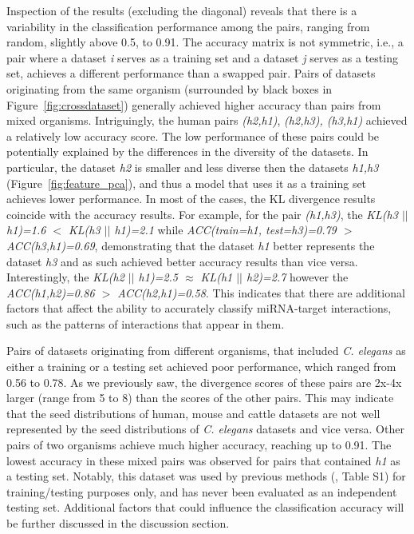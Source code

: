 \documentclass{bmcart}
\begin{document}
Inspection of the results (excluding the diagonal) reveals that there is a variability in the classification performance among the pairs, ranging from random, slightly above 0.5, to 0.91. The accuracy matrix is not symmetric, i.e., a pair where a dataset \textit{i} serves as a training set and a dataset \textit{j} serves as a testing set, achieves a different performance than a swapped pair. Pairs of datasets originating from the same organism (surrounded by black boxes in Figure~\ref{fig:crossdataset}) generally achieved higher accuracy than pairs from mixed organisms. Intriguingly, the human pairs \textit{(h2,h1)}, \textit{(h2,h3), \textit{(h3,h1)}} achieved a relatively low accuracy score. The low performance of these pairs could be potentially explained by the differences in the diversity of the datasets. In particular, the dataset \textit{h2} is smaller and less diverse then the datasets \textit{h1,h3} (Figure~\ref{fig:feature_pca}), and thus a model that uses it as a training set achieves lower performance. In most of the cases, the KL divergence results coincide with the accuracy results. For example, for the pair \textit{(h1,h3)}, the \textit{KL(h3 $||$ h1)=1.6 $<$ KL(h3 $||$ h1)=2.1} while \textit{ACC(train=h1, test=h3)=0.79 $>$ ACC(h3,h1)=0.69}, demonstrating that the dataset \textit{h1} better represents the dataset \textit{h3} and as such achieved better accuracy results than vice versa. Interestingly, the \textit{KL(h2 $||$ h1)=2.5 $\approx$ KL(h1 $||$ h2)=2.7} however the \textit{ACC(h1,h2)=0.86 $>$ ACC(h2,h1)=0.58}. This indicates that there are additional factors that affect the ability to accurately classify miRNA-target interactions, such as the patterns of interactions that appear in them.

Pairs of datasets originating from different organisms, that included \textit{C. elegans} as either a training or a testing set achieved poor performance, which ranged from 0.56 to 0.78. As we previously saw, the divergence scores of these pairs are 2x-4x larger (range from 5 to 8) than the scores of the other pairs. This may indicate that the seed distributions of human, mouse and cattle datasets are not well represented by the seed distributions of \textit{C. elegans} datasets and vice versa. Other pairs of two organisms achieve much higher accuracy, reaching up to 0.91. The lowest accuracy in these mixed pairs was observed for pairs that contained \textit{h1} as a testing set. Notably, this dataset was used by previous methods (, Table S1) for training/testing purposes only, and has never been evaluated as an independent testing set.   Additional factors that could influence the classification accuracy will be further discussed in the discussion section.
\end{document}
